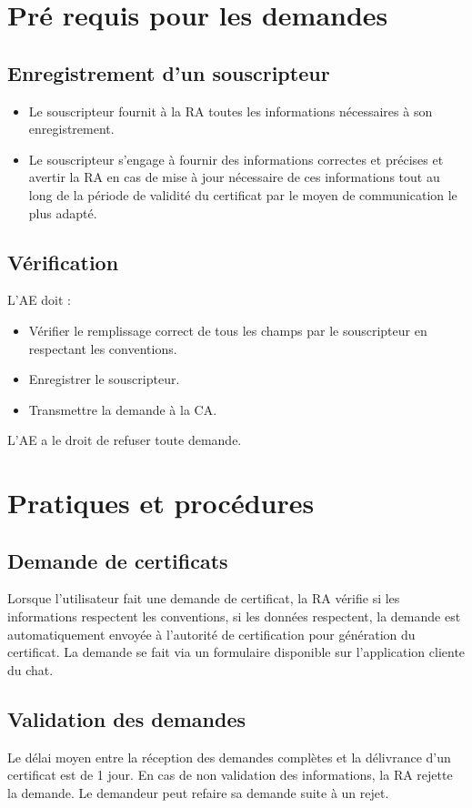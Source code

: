 \documentclass[a4paper,11pt,french]{book}
\begin{document}
\section{Pré requis pour les demandes}
\subsection{Enregistrement d'un souscripteur}
\begin{itemize}
\item Le souscripteur fournit à la RA toutes les informations nécessaires à son enregistrement. 
\item Le souscripteur s'engage à fournir des informations correctes et précises et avertir la RA en cas de mise à jour nécessaire de ces informations tout au long de la période de validité du certificat par le moyen de communication le plus adapté.
\end{itemize}

\subsection{Vérification}
L’AE doit :
\begin{itemize}
\item Vérifier le remplissage correct de tous les champs par le souscripteur en respectant les conventions.
\item Enregistrer le souscripteur.
\item Transmettre la demande à la CA.
\end{itemize}
L’AE a le droit de refuser toute demande.

\section{Pratiques et procédures}
\subsection{Demande de certificats}
Lorsque l'utilisateur fait une demande de certificat, la RA vérifie si les informations respectent les conventions, si les données
respectent, la demande est automatiquement envoyée à l'autorité de certification pour génération du certificat. La demande se fait via un formulaire disponible sur l'application cliente du chat.

\subsection{Validation  des demandes}
Le délai moyen entre la réception des demandes complètes et la délivrance d'un certificat est de 1 jour. En cas de non validation des informations, la RA rejette la demande. Le demandeur peut refaire sa demande suite à un rejet.
\end{document}
